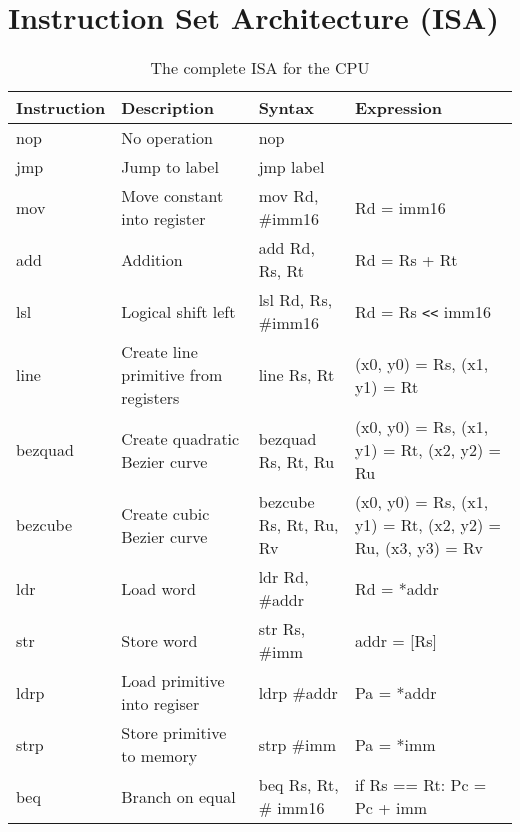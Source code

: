 \chapter{Instruction Set Architecture (ISA)}
\label{app:isa}

\begin{table}[H]
    \begin{tabular}{|p{2cm}|p{5cm}|p{4cm}|p{3cm}|}
    \hline
    Instruction & Description                          & Syntax                 & Expression                                                 \\ \hline
    nop         & No operation                         & nop                    & ~                                                          \\ \hline
    jmp         & Jump to label                        & jmp label              & ~                                                          \\ \hline
    mov         & Move constant into register          & mov Rd, \#imm16        & Rd = imm16                                                 \\ \hline
    add         & Addition                             & add Rd, Rs, Rt         & Rd = Rs + Rt                                               \\ \hline
    lsl         & Logical shift left                   & lsl Rd, Rs, \#imm16    & Rd = Rs \verb|<<| imm16                                           \\ \hline
    line        & Create line primitive from registers & line Rs, Rt            & (x0, y0) = Rs, (x1, y1) = Rt                               \\ \hline
    bezquad     & Create quadratic Bezier curve        & bezquad Rs, Rt, Ru     & (x0, y0) = Rs, (x1, y1) = Rt, (x2, y2) = Ru                \\ \hline
    bezcube     & Create cubic Bezier curve            & bezcube Rs, Rt, Ru, Rv & (x0, y0) = Rs, (x1, y1) = Rt, (x2, y2) = Ru, (x3, y3) = Rv \\ \hline
    ldr         & Load word                            & ldr Rd, \#addr         & Rd = *addr                                                 \\ \hline
    str         & Store word                           & str Rs, \#imm          & addr = [Rs]                                                \\ \hline
    ldrp        & Load primitive into regiser          & ldrp \#addr            & Pa = *addr                                                 \\ \hline
    strp        & Store primitive to memory            & strp \#imm             & Pa = *imm                                                  \\ \hline
    beq         & Branch on equal                      & beq Rs, Rt, \# imm16   & if Rs == Rt: Pc = Pc + imm                            \\ \hline
    \end{tabular}
    \caption{The complete ISA for the CPU}
\end{table}
